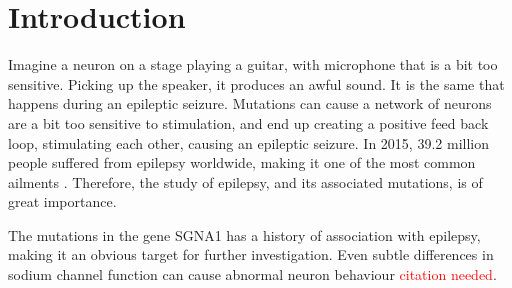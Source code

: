 \section{Introduction}

Imagine a neuron on a stage playing a guitar, with microphone that is a bit too sensitive. Picking
up the  speaker, it produces an awful sound. It is the same that happens during an epileptic
seizure. Mutations can cause a network of neurons are a bit too sensitive to stimulation,
and end up creating a positive feed back loop, stimulating each other, causing an epileptic seizure.
In 2015, 39.2 million people suffered from epilepsy worldwide, making it one of the most common
ailments \cite{vos2016global}. Therefore, the study of epilepsy, and its associated mutations, is
of great importance.

The mutations in the gene SGNA1 has a history of association with epilepsy, making it an obvious
target for further investigation. Even subtle differences in sodium channel function can cause
abnormal neuron behaviour \textcolor{red}{citation needed}.
